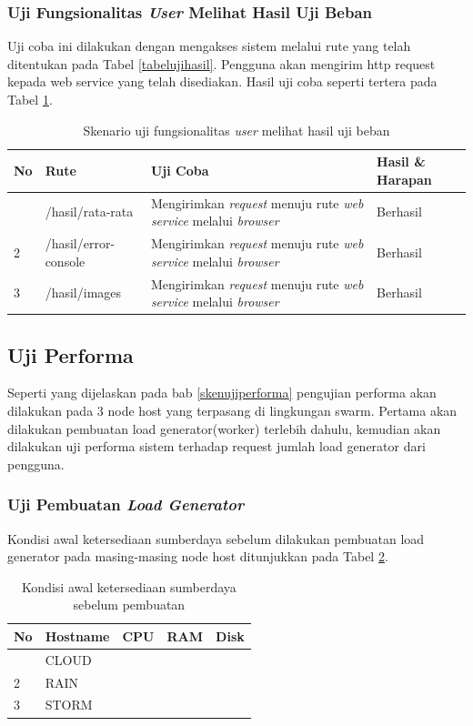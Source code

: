 			\subsubsection{Uji Fungsionalitas \textit{User} Melihat Hasil Uji Beban}
				Uji coba ini dilakukan dengan mengakses sistem melalui rute yang telah ditentukan pada Tabel \ref{tabelujihasil}. Pengguna akan mengirim http request kepada web service yang telah
				disediakan. Hasil uji coba seperti tertera pada Tabel \ref{tabelhasilujihasil}.
				\begin{longtable}{|p{}|p{}|p{0.30\textwidth}|p{}|}
					\caption{Skenario uji fungsionalitas \textit{user} melihat hasil uji beban} \label{tabelhasilujihasil} \\ \hline
					\textbf{No} & \textbf{Rute} & \textbf{Uji Coba} & \textbf{Hasil \& Harapan} \\ \hline
					\endhead
					\endfoot
					\endlastfoot
					1 & /hasil/rata-rata & Mengirimkan \textit{request} menuju rute \textit{web service} melalui \textit{browser} & Berhasil \\ \hline
					2 & /hasil/error-console & Mengirimkan \textit{request} menuju rute \textit{web service} melalui \textit{browser} & Berhasil \\ \hline
					3 & /hasil/images & Mengirimkan \textit{request} menuju rute \textit{web service} melalui \textit{browser} & Berhasil \\ \hline
				\end{longtable}
				

		\subsection{Uji Performa}
			Seperti yang dijelaskan pada bab \ref{skenujiperforma} pengujian performa akan dilakukan pada 3 node host yang terpasang di lingkungan swarm. Pertama akan dilakukan pembuatan load generator(worker) terlebih dahulu, kemudian akan dilakukan uji performa sistem terhadap request jumlah load generator dari pengguna.
			
			\subsubsection{Uji Pembuatan \textit{Load Generator}}
				Kondisi awal ketersediaan sumberdaya sebelum dilakukan pembuatan load generator pada masing-masing node host ditunjukkan pada Tabel \ref{suberdayaawalpembuatan}.
				\begin{longtable}{|p{}|p{}|p{0.15\textwidth}|p{}|p{}|}
					\caption{Kondisi awal ketersediaan sumberdaya sebelum pembuatan} \label{suberdayaawalpembuatan} \\
					\hline
					\textbf{No} & \textbf{Hostname} & \textbf{CPU} & \textbf{RAM} & \textbf{Disk} \\ \hline
					\endhead
					\endfoot
					\endlastfoot
					1 & CLOUD & & &  \\ \hline
					2 & RAIN & & &  \\ \hline
					3 & STORM & & &  \\ \hline
				\end{longtable}
			
